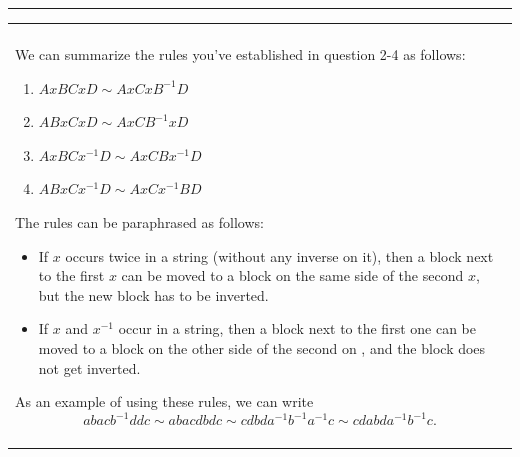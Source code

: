 \documentclass[a4paper, 12pt]{article}
\newenvironment{background}
{\begin{center}
    \begin{tabular}{|p{\textwidth}|}
    \hline\\
    }
    { 
    \\\\\hline
    \end{tabular} 
    \end{center}}
\begin{document}
\noindent\rule{7in}{2.8pt}

\begin{background}
We can summarize the rules you've established in question 2-4 as follows:
\begin{enumerate}[(1)]
\item \(AxBCxD\sim AxCxB^{-1}D\)
\item \(ABxCxD\sim AxCB^{-1}xD\)
\item \(AxBCx^{-1}D\sim AxCBx^{-1}D\)
\item \(ABxCx^{-1}D\sim AxCx^{-1}BD\) 
\end{enumerate}
The rules can be paraphrased as follows:
\begin{itemize}
\item If \(x\) occurs twice in a string (without any inverse on it), then a block next to the first \(x\) can be moved to a block on the same side of the second \(x\), but the new block has to be inverted.
\item If \(x\) and \(x^{-1}\) occur in a string, then a block next to the first one can be moved to a block on the other side of the second on , and the block does not get inverted. 
\end{itemize}
As an example of using these rules, we can write 
\[abacb^{-1}ddc\sim abacdbdc\sim cdbda^{-1}b^{-1}a^{-1}c\sim cdabda^{-1}b^{-1}c.\]
\end{background}
\end{document}
